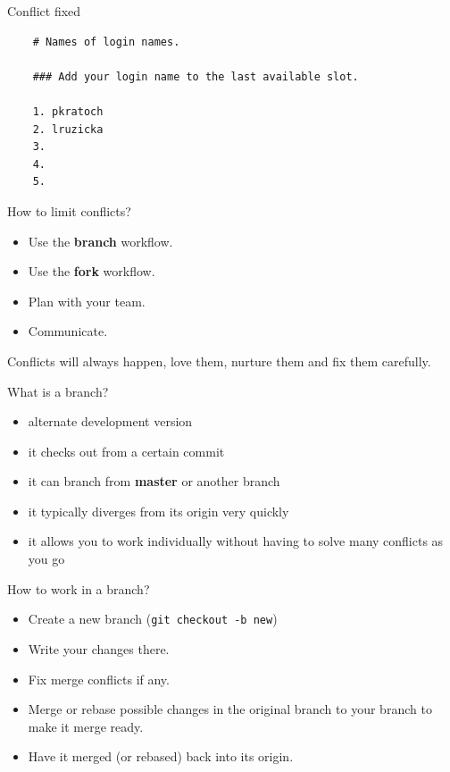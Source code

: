 \documentclass[14pt]{beamer}
\begin{document}
	\begin{frame}[fragile]{Conflict fixed}
	\begin{verbatim}
	# Names of login names.
	
	### Add your login name to the last available slot.
	
	1. pkratoch
	2. lruzicka
	3.
	4.
	5.
	\end{verbatim}
	\end{frame}


	\begin{frame}{How to limit conflicts?}
	\begin{itemize}
		\item Use the \textbf{branch} workflow.
		\item Use the \textbf{fork} workflow.
		\item Plan with your team.
		\item Communicate.
	\end{itemize}

	\vspace{5pt}

	Conflicts will always happen, love them, nurture them and fix them carefully.
\end{frame}

	\begin{frame}{What is a branch?}
	\begin{itemize}
		\item alternate development version
		\item it checks out from a certain commit
		\item it can branch from \textbf{master} or another branch
		\item it typically diverges from its origin very quickly
		\item it allows you to work individually without having to solve many conflicts as you go
	\end{itemize}
\end{frame}

	\begin{frame}{How to work in a branch?}
	\begin{itemize}
		\item Create a new branch (\texttt{git checkout -b new})
		\item Write your changes there.
		\item Fix merge conflicts if any.
		\item Merge or rebase possible changes in the original branch to your branch to make it merge ready.
		\item Have it merged (or rebased) back into its origin.
	\end{itemize}
\end{frame}
\end{document}

